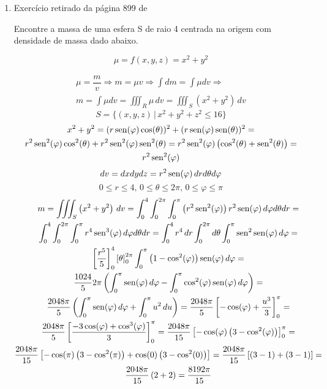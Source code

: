 \begin{enumerate}
	\item Exercício retirado da página 899 de \cite{Jon_Rogawski_calculo_v2}
	
	Encontre a massa de uma esfera S de raio 4 centrada na origem com densidade de massa dado abaixo.
	
	\begin{equation*}
		\mu = f(x,y,z) = x^2 + y^2
	\end{equation*}
	
	\begin{gather*}
		\mu = \dfrac{m}{v} \Rightarrow m = \mu v \Rightarrow \int dm = \int \mu dv \Rightarrow\\ m = \int \mu dv = \iiint_R \mu\, dv = \iiint_S \left(x^2 + y^2\right)\, dv
	\end{gather*}
	\begin{equation*}
		S = \{(x,y,z) \,|\, x^2 + y^2 + z^2 \leq 16\}
	\end{equation*}
	\begin{gather*}
		x^2 + y^2 = (r\operatorname{sen}(\varphi)\cos(\theta))^2 + (r\operatorname{sen}(\varphi)\operatorname{sen}(\theta))^2 =\\ r^2\operatorname{sen}^2(\varphi)\cos^2(\theta) + r^2\operatorname{sen}^2(\varphi)\operatorname{sen}^2(\theta) = r^2\operatorname{sen}^2(\varphi)\left(\cos^2(\theta) + \operatorname{sen}^2(\theta)\right) =\\ r^2\operatorname{sen}^2(\varphi)
	\end{gather*}
	\begin{equation*}
		dv = dxdydz = r^2\operatorname{sen}(\varphi)\, dr d\theta d\varphi
	\end{equation*}
	\begin{equation*}
		0 \leq r \leq 4,\, 0 \leq \theta \leq 2\pi,\, 0 \leq \varphi \leq \pi
	\end{equation*}
	\begin{gather*}
		m = \iiint_S \left(x^2 + y^2\right)\, dv = \int_0^4 \int_0^{2\pi} \int_0^{\pi} \left(r^2\sen^2(\varphi)\right)r^2\sen(\varphi)\, d\varphi d\theta dr =\\ \int_0^4 \int_0^{2\pi} \int_0^{\pi} r^4\sen^3(\varphi)\, d\varphi d\theta dr = \int_0^4 r^4\,dr \int_0^{2\pi} d\theta \int_0^{\pi} \sen^2\sen(\varphi)\, d\varphi =\\ \left[\dfrac{r^5}{5}\right]_0^4 \left[\theta\right]_0^{2\pi} \int_0^{\pi} \left(1 - \cos^2(\varphi)\right)\sen(\varphi)\, d\varphi =\\ \dfrac{1024}{5}2\pi \left(\int_0^{\pi} \sen(\varphi)\, d\varphi - \int_0^{\pi} \cos^2(\varphi)\sen(\varphi)\, d\varphi\right) =\\ \dfrac{2048\pi}{5} \left(\int_0^{\pi} \sen(\varphi)\, d\varphi + \int_0^{\pi} u^2\, du\right) = \dfrac{2048\pi}{5} \left[- \cos(\varphi)+ \dfrac{u^3}{3}\right]_0^{\pi} =\\ \dfrac{2048\pi}{5} \left[\dfrac{- 3\cos(\varphi) + \cos^3(\varphi)}{3}\right]_0^{\pi} = \dfrac{2048\pi}{15} \left[-\cos(\varphi)\left(3 - \cos^2(\varphi)\right)\right]_0^{\pi} =\\ \dfrac{2048\pi}{15} \left[-\cos(\pi)\left(3 - \cos^2(\pi)\right) + \cos(0)\left(3 - \cos^2(0)\right)\right] = \dfrac{2048\pi}{15} \left[\left(3 - 1\right) + \left(3 - 1\right)\right] =\\ \dfrac{2048\pi}{15} \left(2 + 2\right) = \dfrac{8192\pi}{15}

\end{gather*}
\end{enumerate}
